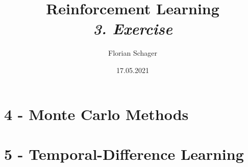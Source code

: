 \documentclass{article}
\title
{
  Reinforcement Learning \\
  \vspace{4pt}
  \normalsize
  \textit{3. Exercise}
}
\author
{
  Florian Schager
}
\date{17.05.2021}
\begin{document}
\maketitle

\section*{4 - Monte Carlo Methods}


\pagebreak






\section*{5 - Temporal-Difference Learning}








\end{document}
